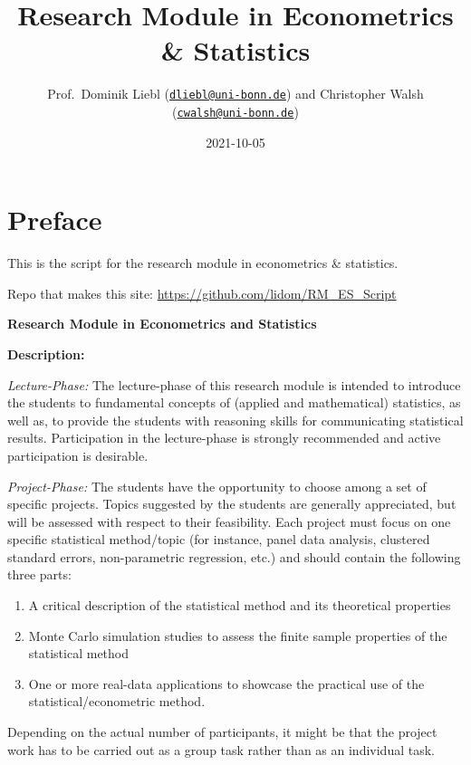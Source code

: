 \documentclass[
]{book}
\title{Research Module in Econometrics \& Statistics}
\author{Prof.~Dominik Liebl (\href{mailto:dliebl@uni-bonn.de}{\nolinkurl{dliebl@uni-bonn.de}}) and Christopher Walsh (\href{mailto:cwalsh@uni-bonn.de}{\nolinkurl{cwalsh@uni-bonn.de}})}
\date{2021-10-05}
\providecommand{\tightlist}{%
  \setlength{\itemsep}{0pt}\setlength{\parskip}{0pt}}
\begin{document}
\maketitle

{
\setcounter{tocdepth}{1}
\tableofcontents
}
\hypertarget{preface}{%
\chapter*{Preface}\label{preface}}

This is the script for the research module in econometrics \& statistics.

Repo that makes this site: \url{https://github.com/lidom/RM_ES_Script}

\textbf{Research Module in Econometrics and Statistics}

\textbf{Description:}

\emph{Lecture-Phase:} The lecture-phase of this research module is intended to introduce the students to fundamental concepts of (applied and mathematical) statistics, as well as, to provide the students with reasoning skills for communicating statistical results. Participation in the lecture-phase is strongly recommended and active participation is desirable.

\emph{Project-Phase:} The students have the opportunity to choose among a set of specific projects. Topics suggested by the students are generally appreciated, but will be assessed with respect to their feasibility. Each project must focus on one specific statistical method/topic (for instance, panel data analysis, clustered standard errors, non-parametric regression, etc.) and should contain the following three parts:

\begin{enumerate}
\def\labelenumi{\arabic{enumi}.}
\tightlist
\item
  A critical description of the statistical method and its theoretical properties
\item
  Monte Carlo simulation studies to assess the finite sample properties of the statistical method
\item
  One or more real-data applications to showcase the practical use of the statistical/econometric method.
\end{enumerate}

Depending on the actual number of participants, it might be that the project work has to be carried out as a group task rather than as an individual task.
\end{document}
